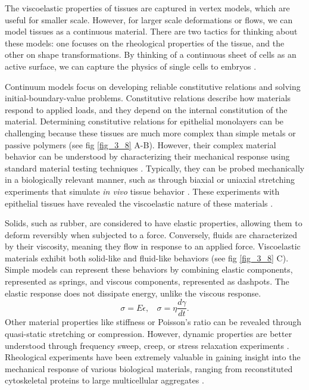 The viscoelastic properties of tissues are captured in vertex models, which are useful for smaller scale. However, for larger scale deformations or flows, we can model tissues as a continuous material. There are two tactics for thinking about these models: one focuses on the rheological properties of the tissue, and the other on shape transformations. By thinking of a continuous sheet of cells as an active surface, we can capture the physics of single cells to embryos \cite{salbreux2017, khoromskaia2023}.

Continuum models focus on developing reliable constitutive relations and solving initial-boundary-value problems. Constitutive relations describe how materials respond to applied loads, and they depend on the internal constitution of the material. Determining constitutive relations for epithelial monolayers can be challenging because these tissues are much more complex than simple metals or passive polymers (see fig \ref{fig_3_8} A-B). However, their complex material behavior can be understood by characterizing their mechanical response using standard material testing techniques \cite{humphrey2002}. Typically, they can be probed mechanically in a biologically relevant manner, such as through biaxial or uniaxial stretching experiments that simulate \textit{in vivo} tissue behavior \cite{humphrey2014}. These experiments with epithelial tissues have revealed the viscoelastic nature of these materials \cite{harris2012, khalilgharibi2019}.

Solids, such as rubber, are considered to have elastic properties, allowing them to deform reversibly when subjected to a force. Conversely, fluids are characterized by their viscosity, meaning they flow in response to an applied force. Viscoelastic materials exhibit both solid-like and fluid-like behaviors (see fig \ref{fig_3_8} C). Simple models can represent these behaviors by combining elastic components, represented as springs, and viscous components, represented as dashpots. The elastic response does not dissipate energy, unlike the viscous response. $$ \sigma = E\epsilon ,\ \ \ \ \sigma = \eta \frac{d\gamma}{dt}. $$ Other material properties like stiffness or Poisson's ratio can be revealed through quasi-static stretching or compression. However, dynamic properties are better understood through frequency sweep, creep, or stress relaxation experiments \cite{guimaraes2020}. Rheological experiments have been extremely valuable in gaining insight into the mechanical response of various biological materials, ranging from reconstituted cytoskeletal proteins to large multicellular aggregates \cite{mofrad2009, cavanaugh2020, xi2018}.

